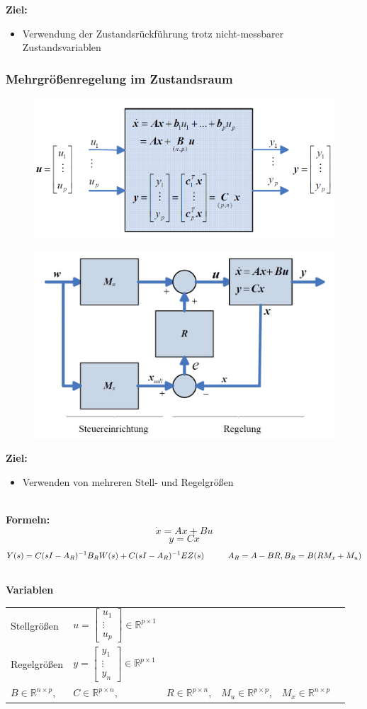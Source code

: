 \documentclass[10pt,a4paper]{article}
\newcommand{\tab}[1][1]{\hspace*{#1cm}}
\newcommand{\vect}[1]{\ensuremath{\begin{bmatrix}#1\end{bmatrix}}}
\begin{document}
\textbf{Ziel:}
\begin{itemize}
	\item Verwendung der Zustandsrückführung trotz nicht-messbarer Zustandsvariablen
\end{itemize}

\subsubsection{Mehrgrößenregelung im Zustandsraum}
\begin{figure}[H]
	\includegraphics[width=0.7\columnwidth]{imgs/abb7_14.png}
\end{figure}
\begin{figure}[H]
	\includegraphics[width=0.7\columnwidth]{imgs/abb7_15.png}
\end{figure}

\textbf{Ziel:}
\begin{itemize}
	\item Verwenden von mehreren Stell- und Regelgrößen
\end{itemize} ~\\

\textbf{Formeln:}
$$
	\dot x = Ax + Bu
$$
$$
	y = Cx
$$ 
$$
	Y(s) = C(sI-A_R)^{-1} B_R W(s) + C(sI-A_R)^{-1} E Z(s) \tab A_R = A - BR, B_R = B(RM_x + M_u)
$$~\\

\textbf{Variablen} ~\\
\begin{tabularx}{\columnwidth}{llllll}
	Stellgrößen & $u = \vect{u_1 \\ \vdots \\ u_p} \in \mathbb{R}^{p \times 1}$ \\
	Regelgrößen & $y = \vect{y_1 \\ \vdots \\ y_n} \in \mathbb{R}^{p \times 1}$ \\
	 $B \in \mathbb{R}^{n \times p}$, 
	 & $C \in \mathbb{R}^{p \times n}$, 
	 & $R \in \mathbb{R}^{p \times n}$, 
	 & $M_u \in \mathbb{R}^{p \times p}$, 
	 & $M_x \in \mathbb{R}^{n \times p}$
\end{tabularx} ~\\
\end{document}

